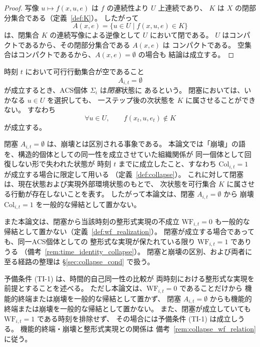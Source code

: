 \begin{proof}
写像 $u\mapsto f(x,u,e)$ は $f$ の連続性より $U$ 上連続であり、
$K$ は $X$ の閉部分集合である（定義~\ref{def:K}）。
したがって
\[
  A(x,e)=\{u\in U \mid f(x,u,e)\in K\}
\]
は、閉集合 $K$ の連続写像による逆像として $U$ において閉である。
$U$ はコンパクトであるから、その閉部分集合である $A(x,e)$ は
コンパクトである。
空集合はコンパクトであるから、$A(x,e)=\emptyset$ の場合も
結論は成立する。
\end{proof}

\begin{definition}[閉塞]
\label{def:blockage_sec2}
時刻 $t$ において可行行動集合が空であること
\[
  A_{i,t} = \emptyset
\]
が成立するとき、ACS個体 $\Sigma_i$ は\emph{閉塞}状態に
あるという。
閉塞においては、いかなる $u\in U$ を選択しても、
一ステップ後の次状態を $K$ に属させることができない。
すなわち
\[
  \forall u\in U,\qquad f(x_t,u,e_t)\notin K
\]
が成立する。
\end{definition}

\begin{remark}
\label{rem:blockage_not_collapse_sec2}
閉塞
$A_{i,t}=\emptyset$
は、崩壊とは区別される事象である。
本論文では「崩壊」の語を、構造的個体としての同一性を成立させていた組織関係が
同一個体として回復しない形で失われた状態が
時刻 $t$ までに成立したこと、すなわち
$\mathrm{Col}_{i,t}=1$
が成立する場合に限定して用いる
（定義~\ref{def:collapse}）。
これに対して閉塞は、現在状態および実現外部環境状態のもとで、
次状態を可行集合 $K$ に属させる行動が存在しないことを表す。
したがって本論文は、閉塞 $A_{i,t}=\emptyset$ から
崩壊 $\mathrm{Col}_{i,t}=1$ を一般的な帰結として置かない。

また本論文は、閉塞から当該時刻の整形式実現の不成立
$\mathrm{WF}_{i,t}=0$ も一般的な帰結として置かない（定義~\ref{def:wf_realization}）。
閉塞が成立する場合であっても、同一ACS個体としての
整形式な実現が保たれている限り
$\mathrm{WF}_{i,t}=1$ でありうる
（備考~\ref{rem:time_identity_collapse}）。
閉塞と崩壊の区別、および両者に至る経路の整理は
\S\ref{sec:collapse_cond} で扱う。
\end{remark}

\begin{remark}
\label{rem:time_identity_collapse}
予備条件 (TI-1) は、時間的自己同一性の比較が
両時刻における整形式な実現を前提とすることを述べる。
ただし本論文は、$\mathrm{WF}_{i,t}=0$ であることだけから
機能的終端または崩壊を一般的な帰結として置かず、
閉塞 $A_{i,t}=\emptyset$ からも機能的終端または崩壊を一般的な帰結として置かない。
また、閉塞が成立していても $\mathrm{WF}_{i,t}=1$ である時刻を排除せず、
その場合には予備条件 (TI-1) は成立しうる。
機能的終端・崩壊と整形式実現との関係は
備考~\ref{rem:collapse_wf_relation} に従う。
\end{remark}

